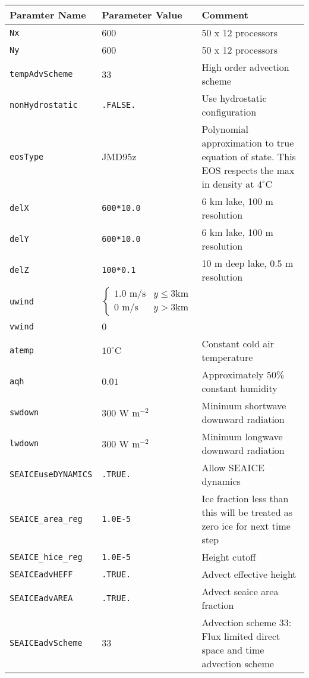 \documentclass[11pt]{article}
\begin{document}
\begin{longtable}{  p{}  p{}  p{}  }
\hline
\textbf{Paramter Name} & \textbf{Parameter Value} & \textbf{Comment} \\ \hline
\verb|Nx| & 600 & 50 x 12 processors \\ \hline
\verb|Ny| & 600 & 50 x 12 processors \\ \hline
\verb|tempAdvScheme|	&	33	&	High order advection scheme \\ \hline
\verb|nonHydrostatic| & \verb|.FALSE.| & Use hydrostatic configuration \\ \hline
\verb|eosType|		&	JMD95z	&	Polynomial approximation to true equation of state. This EOS respects the max in density at $4^{\circ} \textrm{C}$\\ \hline
\verb|delX|			&	\verb|600*10.0|	&	6 km lake, 100 m resolution \\ \hline
\verb|delY|			&	\verb|600*10.0|	&	6 km lake, 100 m resolution \\ \hline
\verb|delZ|			&	\verb|100*0.1 |	&	10 m deep lake, 0.5 m resolution \\ \hline

\verb|uwind|		&	\begin{equation*} \begin{cases} 1.0 \text{ m/s} & y \leq 3 \text{km} \\ 0 \text{ m/s} & y > 3 \text{km}   \end{cases} \end{equation*} & \\ \hline
\verb|vwind| 	& 0	& \\ \hline
\verb|atemp| 	& $10^{\circ} \text{C}$		& Constant cold air temperature \\ \hline
\verb|aqh| 		& $0.01$		&	Approximately 50\% constant humidity \\ \hline
\verb|swdown| 	& $300 \text{ W} \text{ m}^{-2}$	& Minimum shortwave downward radiation \\ \hline
\verb|lwdown| 	& $300 \text{ W} \text{ m}^{-2}$	& Minimum longwave downward radiation \\ \hline

\verb|SEAICEuseDYNAMICS| & \verb|.TRUE.| & Allow SEAICE dynamics \\ \hline
\verb|SEAICE_area_reg|   & \verb|1.0E-5| & Ice fraction less than this will be treated as zero ice for next time step \\ \hline
\verb|SEAICE_hice_reg|   & \verb|1.0E-5| & Height cutoff \\ \hline
\verb|SEAICEadvHEFF|     & \verb|.TRUE.| & Advect effective height \\ \hline
\verb|SEAICEadvAREA|     & \verb|.TRUE.| & Advect seaice area fraction \\ \hline
\verb|SEAICEadvScheme|   & $33$			& Advection scheme 33: Flux limited direct space and time advection scheme \\ \hline


\end{longtable}
\end{document}
